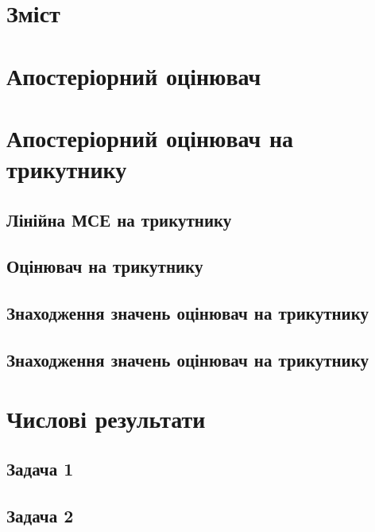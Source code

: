 \documentclass[a4paper,oneside]{article}
\begin{document}
	\pagestyle{empty} %

	

	\linespread{1.5}
	\selectfont
	\addtocounter{page}{1}

	\section*{Зміст}

	\makeatletter
	\makeatother

	\newpage
	\pagestyle{plain}

	
	
	
	
	\section{Апостеріорний оцінювач}
	\section{Апостеріорний оцінювач на трикутнику}
		\subsection{Лінійна МСЕ на трикутнику}
		\subsection{Оцінювач на трикутнику}
		\subsection{Знаходження значень оцінювач на трикутнику}
		\subsection{Знаходження значень оцінювач на трикутнику}
	\section{Числові результати}
		\subsection{Задача 1}
		\subsection{Задача 2}
\end{document}
